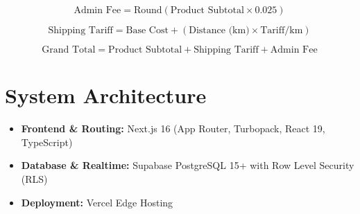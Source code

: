 \documentclass[11pt,a4paper]{article}
\begin{document}
\begin{equation}
\text{Admin Fee} = \text{Round}(\text{Product Subtotal} \times 0.025)
\end{equation}

\begin{equation}
\text{Shipping Tariff} = \text{Base Cost} + (\text{Distance (km)} \times \text{Tariff/km})
\end{equation}

\begin{equation}
\text{Grand Total} = \text{Product Subtotal} + \text{Shipping Tariff} + \text{Admin Fee}
\end{equation}

\section{System Architecture}
\begin{itemize}
    \item \textbf{Frontend \& Routing:} Next.js 16 (App Router, Turbopack, React 19, TypeScript)
    \item \textbf{Database \& Realtime:} Supabase PostgreSQL 15+ with Row Level Security (RLS)
    \item \textbf{Deployment:} Vercel Edge Hosting
\end{itemize}
\end{document}
